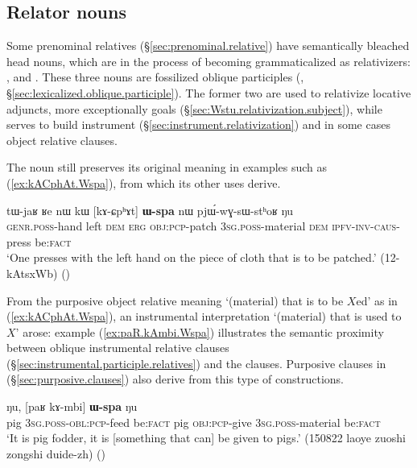 \subsection{Relator nouns} \label{sec:Wspa.relative}  
Some prenominal relatives (§\ref{sec:prenominal.relative}) have semantically bleached head nouns, which are in the process of becoming grammaticalized as relativizers:  ,   and . These three nouns are fossilized oblique participles (, §\ref{sec:lexicalized.oblique.participle}). The former two are used to relativize locative adjuncts, more exceptionally goals (§\ref{sec:Wstu.relativization.subject}), while   serves to build  instrument (§\ref{sec:instrument.relativization}) and in some cases object relative clauses.
 
The noun  still preserves its original meaning in examples such as (\ref{ex:kACphAt.Wspa}), from which its other uses derive.
 
\begin{exe}
\ex \label{ex:kACphAt.Wspa} 
\gll tɯ-jaʁ ʁe nɯ kɯ [kɤ-ɕpʰɤt] \textbf{ɯ-spa} nɯ pjɯ́-wɣ-sɯ-stʰoʁ ŋu \\
\textsc{genr}.\textsc{poss}-hand left \textsc{dem} \textsc{erg} \textsc{obj}:\textsc{pcp}-patch \textsc{3sg}.\textsc{poss}-material \textsc{dem} \textsc{ipfv}-\textsc{inv}-\textsc{caus}-press be:\textsc{fact} \\
\glt `One presses with the left hand on the piece of cloth that is to be patched.' (12-kAtsxWb)
()
\end{exe}

From the purposive object relative meaning `(material) that is to be $X$ed' as in (\ref{ex:kACphAt.Wspa}), an instrumental interpretation `(material) that is used to $X$' arose: example (\ref{ex:paR.kAmbi.Wspa}) illustrates the semantic proximity between oblique instrumental relative clauses (§\ref{sec:instrumental.participle.relatives}) and the  clauses. Purposive clauses in  (§\ref{sec:purposive.clauses}) also derive from this type of constructions.

\begin{exe}
\ex \label{ex:paR.kAmbi.Wspa} 
 ŋu, [paʁ kɤ-mbi] \textbf{ɯ-spa} ŋu \\
pig \textsc{3sg}.\textsc{poss}-\textsc{obl}:\textsc{pcp}-feed be:\textsc{fact} pig \textsc{obj}:\textsc{pcp}-give \textsc{3sg}.\textsc{poss}-material be:\textsc{fact} \\
\glt `It is pig fodder, it is [something that can] be given to pigs.' (150822 laoye zuoshi zongshi duide-zh)
()
\end{exe}  

